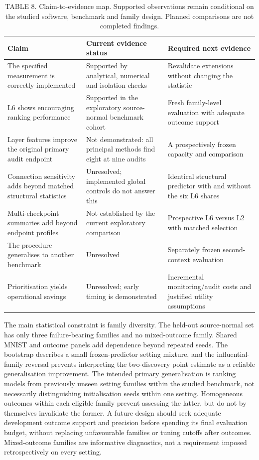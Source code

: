 \begin{table}[t]
\caption{TABLE 8. Claim-to-evidence map. Supported observations remain conditional on the studied software, benchmark and family design. Planned comparisons are not completed findings.}
\label{tab:claims}
\centering\small
\begin{tabular}{lll}
\toprule Claim & Current evidence status & Required next evidence\\\midrule
The specified measurement is correctly implemented & Supported by analytical, numerical and isolation checks & Revalidate extensions without changing the statistic\\
L6 shows encouraging ranking performance & Supported in the exploratory source-normal benchmark cohort & Fresh family-level evaluation with adequate outcome support\\
Layer features improve the original primary audit endpoint & Not demonstrated: all principal methods find eight at nine audits & A prospectively frozen capacity and comparison\\
Connection sensitivity adds beyond matched structural statistics & Unresolved; implemented global controls do not answer this & Identical structural predictor with and without the six L6 shares\\
Multi-checkpoint summaries add beyond endpoint profiles & Not established by the current exploratory comparison & Prospective L6 versus L2 with matched selection\\
The procedure generalises to another benchmark & Unresolved & Separately frozen second-context evaluation\\
Prioritisation yields operational savings & Unresolved; early timing is demonstrated & Incremental monitoring/audit costs and justified utility assumptions\\\bottomrule
\end{tabular}
\end{table}

The main statistical constraint is family diversity. The held-out source-normal set has only three failure-bearing families and no mixed-outcome family. Shared MNIST and outcome panels add dependence beyond repeated seeds. The bootstrap describes a small frozen-predictor setting mixture, and the influential-family reversal prevents interpreting the two-discovery point estimate as a reliable generalisation improvement. The intended primary generalisation is ranking models from previously unseen setting families within the studied benchmark, not necessarily distinguishing initialisation seeds within one setting. Homogeneous outcomes within each eligible family prevent assessing the latter, but do not by themselves invalidate the former. A future design should seek adequate development outcome support and precision before spending its final evaluation budget, without replacing unfavourable families or tuning cutoffs after outcomes. Mixed-outcome families are informative diagnostics, not a requirement imposed retrospectively on every setting.

